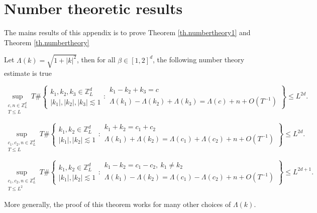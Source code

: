\section{Number theoretic results}
The mains results of this appendix is to prove Theorem \ref{th.numbertheory1} and Theorem \ref{th.numbertheory} 

\begin{thm}\label{th.numbertheory1}
Let $\Lambda(k)=\sqrt{1+|k|^2}$, then for all $\beta\in [1,2]^d$, the following number theory estimate is true

\begin{equation}\label{eq.numbertheory1}
    \sup_{\substack{c,n\in\mathbb{Z}_L^d\\T\le L}}
    T\#\left\{
        \begin{matrix}
            k_1,k_2,k_3\in\mathbb{Z}_L^d \\
            |k_1|,|k_2|,|k_3|\lesssim 1
        \end{matrix}
        :
        \begin{matrix}
            k_1-k_2+k_3=c \\
            \Lambda(k_1)-\Lambda(k_2)+\Lambda(k_3)=\Lambda(c)+n+O(T^{-1})
        \end{matrix}
    \right\}\le L^{2d}.
\end{equation}

\begin{equation}\label{eq.numbertheory1'}
    \sup_{\substack{c_1,c_2,n\in\mathbb{Z}_L^d\\T\le L}}
    T\#\left\{
        \begin{matrix}
            k_1,k_2\in\mathbb{Z}_L^d \\
            |k_1|, |k_2|\lesssim 1
        \end{matrix}
        :
        \begin{matrix}
            k_1+ k_2=c_1+ c_{2} \\
            \Lambda(k_1)+\Lambda(k_2)=\Lambda(c_1)+ \Lambda(c_2)+n+O(T^{-1})
        \end{matrix}
        \right\}\le L^{2d}.
\end{equation}

\begin{equation}\label{eq.numbertheory1''}
    \sup_{\substack{c_1,c_2,n\in\mathbb{Z}_L^d\\T\le L^2}}
    T\#\left\{
        \begin{matrix}
            k_1,k_2\in\mathbb{Z}_L^d \\
            |k_1|, |k_2|\lesssim 1
        \end{matrix}
        :
        \begin{matrix}
            k_1- k_2=c_1- c_{2},\ k_1\ne k_2 \\
            \Lambda(k_1)-\Lambda(k_2)=\Lambda(c_1)- \Lambda(c_2)+n+O(T^{-1})
        \end{matrix}
        \right\}\le L^{2d+1}.
\end{equation}

More generally, the proof of this theorem works for many other choices of $\Lambda(k)$.
\end{thm}


